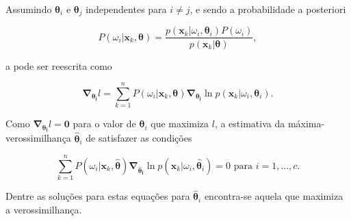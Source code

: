 \noindent Assumindo $\boldsymbol{\theta}_i$ e $\boldsymbol{\theta}_j$ independentes para $i \neq j$, e sendo a probabilidade a posteriori

\begin{equation}
    P(\omega_i|\boldsymbol{x}_k, \boldsymbol{\theta}) = \frac{p(\boldsymbol{x}_k|\omega_i, \boldsymbol{\theta}_i)P(\omega_i)}{p(\boldsymbol{x}_k|\boldsymbol{\theta})},
    \label{eq:posteriori_prob_theta}
\end{equation}

\noindent a  pode ser reescrita como

\begin{equation}
    \boldsymbol{\nabla_{\theta_i}} l = \sum_{k=1}^n P(\omega_i|\boldsymbol{x}_k, \boldsymbol{\theta}) \boldsymbol{\nabla_{\theta_i}} \ln p(\boldsymbol{x}_k|\omega_i, \boldsymbol{\theta}_i).
    \label{eq:gradient_theta_log_mixtures_2}
\end{equation}

\noindent Como $\boldsymbol{\nabla_{\theta_i}} l = \boldsymbol{0}$ para o valor de $\boldsymbol{\theta}_i$ que maximiza $l$, a estimativa da máxima-verossimilhança $\boldsymbol{\hat{\theta}}_i$ de satisfazer as condições

\begin{equation}
    \sum_{k=1}^n P(\omega_i|\boldsymbol{x}_k, \boldsymbol{\hat{\theta}}) \boldsymbol{\nabla_{\hat{\theta}_i}} \ln p(\boldsymbol{x}_k|\omega_i, \boldsymbol{\hat{\theta}}_i) = 0 \text{ para } i = 1, ..., c.
    \label{eq:gradient_hat_theta_log_mixtures_equals_zero}
\end{equation}

\noindent Dentre as soluções para estas equações para $\boldsymbol{\hat{\theta}}_i$ encontra-se aquela que maximiza a verossimilhança.